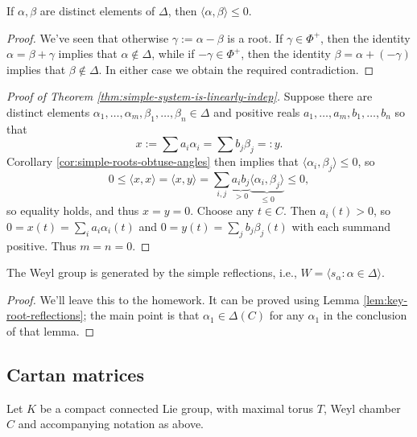 \documentclass[reqno]{amsart} 
\begin{document}
\begin{corollary}\label{cor:simple-roots-obtuse-angles}
  If $\alpha, \beta$ are distinct elements of $\Delta$, then $\langle \alpha, \beta \rangle \leq 0$.
\end{corollary}
\begin{proof}
  We've seen that otherwise $\gamma := \alpha - \beta$ is a root.  If $\gamma \in \Phi^+$, then the identity $\alpha = \beta + \gamma$ implies that $\alpha \notin \Delta$, while if $-\gamma \in \Phi^+$, then the identity $\beta = \alpha + (-\gamma)$ implies that $\beta \notin \Delta$.  In either case we obtain the required contradiction.
\end{proof}

\begin{proof}
[Proof of Theorem \ref{thm:simple-system-is-linearly-indep}]
  Suppose there are distinct elements $\alpha_1,\dotsc,\alpha_m, \beta_1, \dotsc, \beta_n \in \Delta$ and positive reals $a_1,\dotsc,a_m,b_1,\dotsc,b_n$ so that
  \begin{equation*}
    x := \sum a_i \alpha_i = \sum b_j \beta_j =: y.
  \end{equation*}
  Corollary \ref{cor:simple-roots-obtuse-angles} then implies that $\langle \alpha_i, \beta_j \rangle \leq 0$, so
  \begin{equation*}
    0 \leq \langle x, x \rangle = \langle x, y \rangle = \sum_{i,j} \underbrace{a_i b_j}_{>0} \underbrace{\langle \alpha_i, \beta_j \rangle}_{\leq 0} \leq 0,
  \end{equation*}
  so equality holds, and thus $x = y = 0$.  Choose any $t \in C$.  Then $a_i(t) > 0$, so $0 = x(t) = \sum_{i} a_i \alpha_i(t)$ and $0 = y(t) = \sum_{j} b_j \beta_j(t)$ with each summand positive.  Thus $m = n = 0$.
\end{proof}

\begin{theorem}
  The Weyl group is generated by the simple reflections, i.e., $W = \langle s_\alpha : \alpha \in \Delta \rangle$.
\end{theorem}
\begin{proof}
  We'll leave this to the homework.  It can be proved using Lemma \ref{lem:key-root-reflections}; the main point is that $\alpha_1 \in \Delta(C)$ for any $\alpha_1$ in the conclusion of that lemma.
\end{proof}


\subsection{Cartan matrices}\label{sec:cnh2vowy35}
Let $K$ be a compact connected Lie group, with maximal torus $T$, Weyl chamber $C$ and accompanying notation as above.
\end{document}
